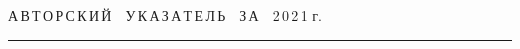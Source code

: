 




\def\stat{cont}


{%




\raggedleft\Large \bf%


А\,В\,Т\,О\,Р\,С\,К\,И\,Й\ \ У\,К\,А\,З\,А\,Т\,Е\,Л\,Ь\ \ З\,А\ \ 2\,0\,2\,1 г. \vskip 17pt


 \hrule


 \par


 }







\label{st\stat}

















\def\leftkol{\ } %


\def\rightkol{\ } %






















\def\leftfootline{\small{\textbf{\thepage}


\hfill СИСТЕМЫ И СРЕДСТВА ИНФОРМАТИКИ\ \ \ выпуск~31\ \ \ №~4\ \ \ 2021}


}%


 \def\rightfootline{\small{СИСТЕМЫ И СРЕДСТВА ИНФОРМАТИКИ\ \ \ выпуск~31\ \ \


№~4\ \ \ 2021


 \hfill \textbf{\thepage}}}





